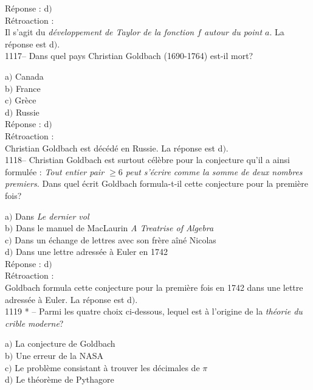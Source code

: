 ﻿\documentclass[letterpaper, 12pt]{article}
\begin{document}
R\'eponse : d$)$\\

R\'etroaction :\\
Il s'agit du {\sl d\'eveloppement de Taylor de la fonction $f$
autour du point $a$}.
La r\'eponse est d$)$.\\

1117-- Dans quel pays Christian Goldbach (1690-1764) est-il mort?

a$)$ Canada \\
b$)$ France  \\
c$)$ Gr\`ece \\
d$)$ Russie \\

R\'eponse : d$)$\\

R\'etroaction : \\
Christian Goldbach est d\'ec\'ed\'e en Russie. La r\'eponse est d$)$.\\

1118-- Christian Goldbach est surtout c\'el\`ebre pour la conjecture
qu'il a ainsi formul\'ee : {\sl Tout entier pair $\ge6$ peut
s'\'ecrire comme la somme de deux nombres premiers.} Dans quel
\'ecrit Goldbach formula-t-il cette conjecture pour la premi\`ere
fois?

a$)$ Dans {\sl Le dernier vol} \\
b$)$ Dans le manuel de MacLaurin {\sl A Treatrise of Algebra} \\
c$)$ Dans un \'echange de lettres avec son fr\`ere a\^in\'e Nicolas \\
d$)$ Dans une lettre adress\'ee \`a Euler en 1742 \\

R\'eponse : d$)$\\

R\'etroaction : \\
Goldbach formula cette conjecture pour la premi\`ere fois en 1742 dans une
lettre adress\'ee \`a Euler. La r\'eponse est d$)$.\\

1119 * -- Parmi les quatre choix ci-dessous, lequel est \`a
l'origine de la {\sl th\'eorie du crible moderne}?

a$)$ La conjecture de Goldbach \\
b$)$ Une erreur de la NASA  \\
c$)$ Le probl\`eme consistant \`a trouver les d\'ecimales de $\pi$ \\
d$)$ Le th\'eor\`eme de Pythagore \\
\end{document}
